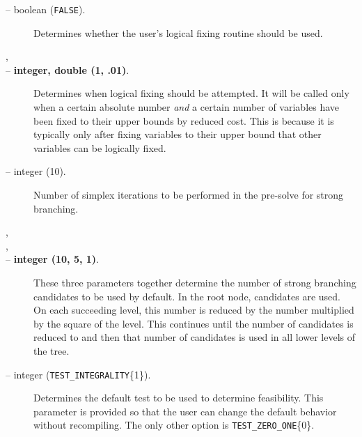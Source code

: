 \begin{description}
\item[ -- boolean ({\tt FALSE}).] 
Determines whether the user's logical fixing routine should be used.

\item[,]
\item[ -- 
{\bf integer, double (1, .01)}.]
Determines when logical fixing should be attempted. It will be called
only when a certain absolute number {\em and} a certain number of variables
have been fixed to their upper bounds by reduced cost. This is because
it is typically only after fixing variables to their upper bound that
other variables can be logically fixed.

\label{strong_branching}
\item[ -- integer (10).] 
Number of simplex iterations to be performed in the pre-solve for
strong branching.

\item[,]
\item[,]
\item[ --
{\bf integer (10, 5, 1)}.]
These three parameters together determine the number of strong
branching candidates to be used by default. In the root node,
 candidates are used. On each
succeeding level, this number is reduced by the number 
 multiplied by the square of the level.
This continues until the number of candidates is reduced to 
 and then that number of candidates
is used in all lower levels of the tree.

\item[ -- integer ({\tt TEST\_INTEGRALITY}\{1\}).]
Determines the default test to be used to determine feasibility. This
parameter is provided so that the user can change the default behavior
without recompiling. The only other option is {\tt TEST\_ZERO\_ONE}\{0\}.


\end{description}
